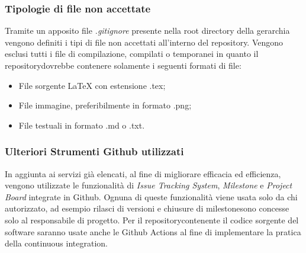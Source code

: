 	\subsubsection{Tipologie di file non accettate}
		Tramite un apposito file \textit{.gitignore} presente nella root directory della gerarchia vengono definiti i tipi di file non accettati all'interno del repository\glo. Vengono esclusi tutti i file di compilazione, compilati o temporanei in quanto il repository\glosp dovrebbe contenere solamente i seguenti formati di file:
		\begin{itemize}
			\item File sorgente \LaTeX \xspace con estensione .tex;
			\item File immagine, preferibilmente in formato .png;
			\item File testuali in formato .md o .txt.			
		\end{itemize}
	
	\subsubsection{Ulteriori Strumenti Github utilizzati}
		In aggiunta ai servizi già elencati, al fine di migliorare efficacia ed efficienza, vengono utilizzate le funzionalità di \textit{Issue Tracking System},
		\textit{Milestone} e \textit{Project Board} integrate in Github. Ognuna di queste funzionalità viene usata solo da chi autorizzato, ad esempio rilasci di versioni e chiusure di milestone\glosp sono concesse solo al responsabile di progetto.
		\newline
		Per il repository\glosp contenente il codice sorgente del software saranno usate anche le Github Actions al fine di implementare la pratica della continuous integration.
		